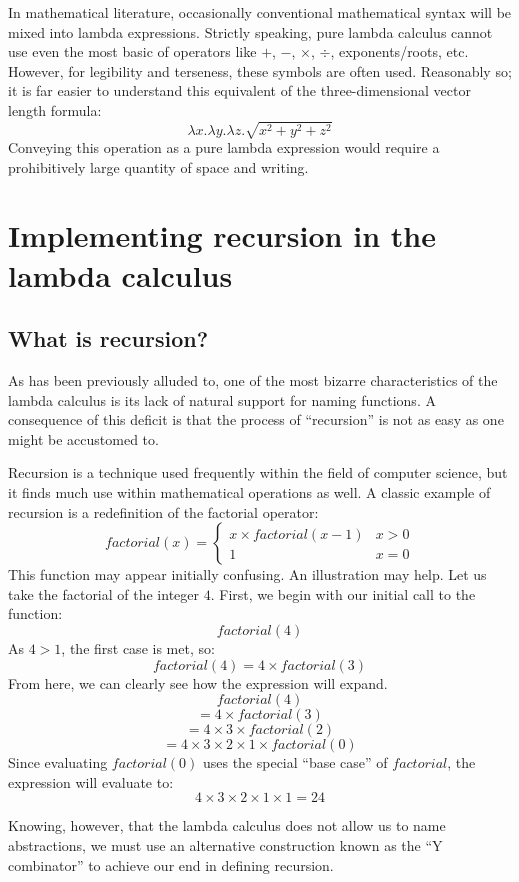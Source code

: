 \documentclass[twocolumn,titlepage,12pt]{article}
\begin{document}
In mathematical literature, occasionally conventional mathematical syntax will be mixed into lambda expressions. Strictly speaking, pure lambda calculus cannot use even the most basic of operators like $+$, $-$, $\times$, $\div$, exponents/roots, etc. However, for legibility and terseness, these symbols are often used. Reasonably so; it is far easier to understand this equivalent of the three-dimensional vector length formula:
$$\lambda x.\lambda y.\lambda z.\sqrt{x^2+y^2+z^2}$$
Conveying this operation as a pure lambda expression would require a prohibitively large quantity of space and writing.

\section{Implementing recursion in the lambda calculus}
\subsection{What is recursion?}
As has been previously alluded to, one of the most bizarre characteristics of the lambda calculus is its lack of natural support for naming functions. A consequence of this deficit is that the process of ``recursion'' is not as easy as one might be accustomed to.

Recursion is a technique used frequently within the field of computer science, but it finds much use within mathematical operations as well. A classic example of recursion is a redefinition of the factorial operator:
\[
factorial(x)=
\begin{cases}
    x\times factorial(x-1) & x>0 \\
    1 & x=0
\end{cases}
\]
This function may appear initially confusing. An illustration may help. Let us take the factorial of the integer $4$. First, we begin with our initial call to the function:
$$factorial(4)$$
As $4>1$, the first case is met, so:
$$factorial(4)=4\times factorial(3)$$
From here, we can clearly see how the expression will expand.
$$factorial(4)$$
$$=4\times factorial(3)$$
$$=4\times 3\times factorial(2)$$
$$=4\times 3\times 2\times 1\times factorial(0)$$
Since evaluating $factorial(0)$ uses the special ``base case'' of $factorial$, the expression will evaluate to:
$$4\times 3\times 2\times 1\times 1=24$$

Knowing, however, that the lambda calculus does not allow us to name abstractions, we must use an alternative construction known as the ``Y combinator'' to achieve our end in defining recursion.
\end{document}
